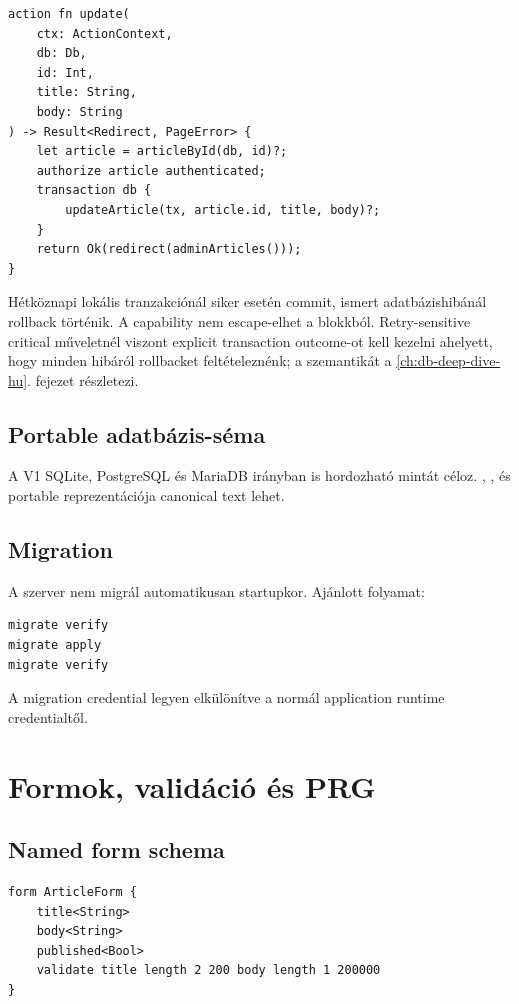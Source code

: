 \begin{lstlisting}[language=RWLang]
action fn update(
    ctx: ActionContext,
    db: Db,
    id: Int,
    title: String,
    body: String
) -> Result<Redirect, PageError> {
    let article = articleById(db, id)?;
    authorize article authenticated;
    transaction db {
        updateArticle(tx, article.id, title, body)?;
    }
    return Ok(redirect(adminArticles()));
}
\end{lstlisting}

Hétköznapi lokális tranzakciónál siker esetén commit, ismert adatbázishibánál rollback történik. A  capability nem escape-elhet a blokkból. Retry-sensitive critical műveletnél viszont explicit transaction outcome-ot kell kezelni ahelyett, hogy minden hibáról rollbacket feltételeznénk; a  szemantikát a \ref{ch:db-deep-dive-hu}. fejezet részletezi.

\subsection*{Portable adatbázis-séma}

A V1 SQLite, PostgreSQL és MariaDB irányban is hordozható mintát céloz. , ,  és  portable reprezentációja canonical text lehet.

\subsection*{Migration}

A szerver nem migrál automatikusan startupkor. Ajánlott folyamat:

\begin{lstlisting}
migrate verify
migrate apply
migrate verify
\end{lstlisting}

A migration credential legyen elkülönítve a normál application runtime credentialtől.


\section{Formok, validáció és PRG}

\subsection*{Named form schema}

\begin{lstlisting}[language=RWLang]
form ArticleForm {
    title<String>
    body<String>
    published<Bool>
    validate title length 2 200 body length 1 200000
}
\end{lstlisting}

